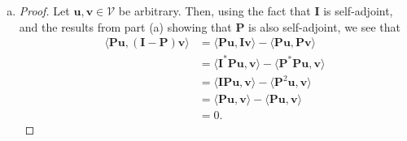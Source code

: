 \documentclass[12pt]{amsart}
\newcommand{\1}{\mathbbm{1}}
\numberwithin{equation}{section}
\numberwithin{Theorem}{section}
\theoremstyle{plain} %
\theoremstyle{definition}
\theoremstyle{remark}
\begin{document}
\begin{enumerate}[1.]
\begin{enumerate}[(a)]
	\item 
	\begin{proof}
		Let \(\mathbf{u},\mathbf{v}\in\mathcal{V}\) be arbitrary.
		Then, using the fact that \(\mathbf{I}\) is self-adjoint,
		and the results from part (a) showing that \(\mathbf{P}\) is also self-adjoint, 
		we see that
		\begin{align*}
			\langle \mathbf{P} \mathbf{u}, (\mathbf{I}-\mathbf{P}) \mathbf{v} \rangle
			&= \langle \mathbf{P} \mathbf{u}, \mathbf{I} \mathbf{v} \rangle - \langle \mathbf{P} \mathbf{u}, \mathbf{P} \mathbf{v} \rangle \\
			&= \langle \mathbf{I^*} \mathbf{P} \mathbf{u}, \mathbf{v} \rangle - \langle \mathbf{P^*} \mathbf{P} \mathbf{u},  \mathbf{v} \rangle \\
			&= \langle \mathbf{I} \mathbf{P} \mathbf{u}, \mathbf{v} \rangle - \langle \mathbf{P}^2 \mathbf{u},  \mathbf{v} \rangle \\
			&= \langle \mathbf{P}\mathbf{u}, \mathbf{v} \rangle - \langle \mathbf{P}\mathbf{u}, \mathbf{v} \rangle \\
			&= 0.
		\end{align*}
	\end{proof}
	

\end{enumerate}
\end{enumerate}
\end{document}
